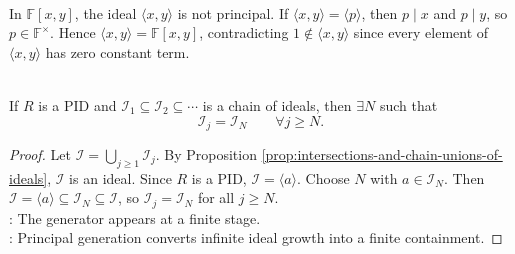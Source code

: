 \begin{example} \label{ex:two-variable-polynomial-ring-not-pid} \\
In $\mathbb{F}[x,y]$, the ideal $\langle x,y\rangle$ is not principal. If $\langle x,y\rangle=\langle p\rangle$, then $p\mid x$ and $p\mid y$, so $p\in\mathbb{F}^{\times}$. Hence $\langle x,y\rangle=\mathbb{F}[x,y]$, contradicting $1\notin\langle x,y\rangle$ since every element of $\langle x,y\rangle$ has zero constant term.
\end{example}

\begin{proposition} \label{prop:pid-ascending-chain-condition} \\
If $R$ is a PID and $\mathcal{I}_1\subseteq\mathcal{I}_2\subseteq\cdots$ is a chain of ideals, then $\exists N$ such that
\[
\mathcal{I}_j=\mathcal{I}_N\qquad\forall j\geq N.
\]
\begin{proof}
Let $\mathcal{I}=\bigcup_{j\geq1}\mathcal{I}_j$. By Proposition \ref{prop:intersections-and-chain-unions-of-ideals}, $\mathcal{I}$ is an ideal. Since $R$ is a PID, $\mathcal{I}=\langle a\rangle$. Choose $N$ with $a\in\mathcal{I}_N$. Then $\mathcal{I}=\langle a\rangle\subseteq\mathcal{I}_N\subseteq\mathcal{I}$, so $\mathcal{I}_j=\mathcal{I}_N$ for all $j\geq N$.\\
: The generator appears at a finite stage.\\
: Principal generation converts infinite ideal growth into a finite containment.
\end{proof}
\end{proposition}


